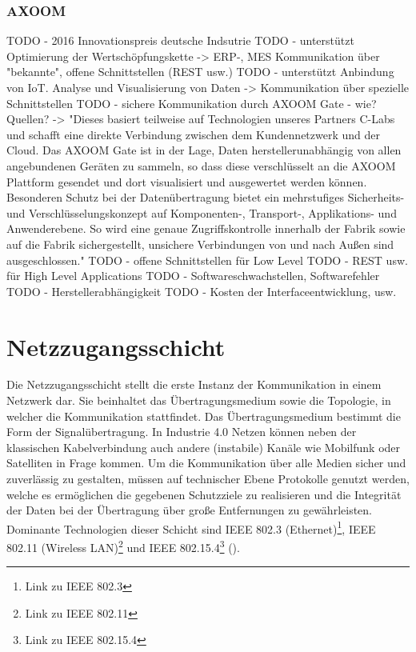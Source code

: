 \subsubsection{AXOOM}
TODO - 2016 Innovationspreis deutsche Indsutrie
TODO - unterstützt Optimierung der Wertschöpfungskette -> ERP-, MES Kommunikation über "bekannte", offene Schnittstellen (REST usw.) 
TODO - unterstützt Anbindung von \ac{IoT}. Analyse und Visualisierung von Daten -> Kommunikation über spezielle Schnittstellen
TODO - sichere Kommunikation durch AXOOM Gate - wie? Quellen? -> "Dieses basiert teilweise auf Technologien unseres Partners C-Labs und schafft eine direkte Verbindung zwischen dem Kundennetzwerk und der Cloud. Das AXOOM Gate ist in der Lage, Daten herstellerunabhängig von allen angebundenen Geräten zu sammeln, so dass diese verschlüsselt an die AXOOM Plattform gesendet und dort visualisiert und ausgewertet werden können. Besonderen Schutz bei der Datenübertragung bietet ein mehrstufiges Sicherheits- und Verschlüsselungskonzept auf Komponenten-, Transport-, Applikations- und Anwenderebene. So wird eine genaue Zugriffskontrolle innerhalb der Fabrik sowie auf die Fabrik sichergestellt, unsichere Verbindungen von und nach Außen sind ausgeschlossen."
TODO - offene Schnittstellen für Low Level
TODO - REST usw. für High Level Applications
TODO - Softwareschwachstellen, Softwarefehler 
TODO - Herstellerabhängigkeit
TODO - Kosten der Interfaceentwicklung, usw.

\section{Netzzugangsschicht}
Die Netzzugangsschicht stellt die erste Instanz der Kommunikation in einem Netzwerk dar. Sie beinhaltet das Übertragungsmedium sowie die Topologie, in welcher die Kommunikation stattfindet. Das Übertragungsmedium bestimmt die Form der Signalübertragung. In Industrie 4.0 Netzen können neben der klassischen Kabelverbindung auch andere (instabile) Kanäle wie Mobilfunk oder Satelliten in Frage kommen. Um die Kommunikation über alle Medien sicher und zuverlässig zu gestalten, müssen auf technischer Ebene Protokolle genutzt werden, welche es ermöglichen die gegebenen Schutzziele zu realisieren und die Integrität der Daten bei der Übertragung über große Entfernungen zu gewährleisten. Dominante Technologien dieser Schicht sind \ac{IEEE} 802.3 (Ethernet)\footnote{Link zu IEEE 802.3}, \ac{IEEE} 802.11 (Wireless LAN)\footnote{Link zu IEEE 802.11} und \ac{IEEE} 802.15.4\footnote{Link zu IEEE 802.15.4} (\cite{sichKom2017}).

